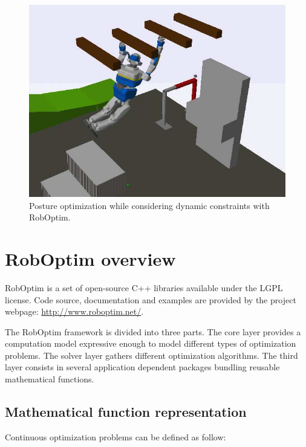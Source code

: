 \documentclass[conference,final,a4paper,twocolumn,9pt]{IEEEtran}
\begin{document}
\begin{figure}[ht!]
  \begin{center}
    \includegraphics[width=\linewidth]{agent-067.jpg}
    \caption{Posture optimization while considering dynamic
      constraints with RobOptim.\label{fig:stence-optimization}}
  \end{center}
\end{figure}



\section{RobOptim overview}\label{sec:roboptim}


RobOptim is a set of open-source C++ libraries available under the
LGPL license. Code source, documentation and examples are provided by
the project webpage: \mbox{\url{http://www.roboptim.net/}}.


The RobOptim framework is divided into three parts. The core layer
provides a computation model expressive enough to model different
types of optimization problems. The solver layer gathers different
optimization algorithms. The third layer consists in several
application dependent packages bundling reusable mathematical
functions.


\subsection{Mathematical function representation}


Continuous optimization problems can be defined as follow:
\end{document}
